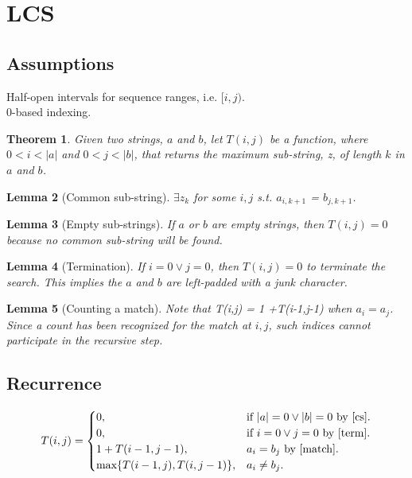 \documentclass{article}
\newtheorem{theorem}{Theorem}[section]
\newtheorem{lemma}[theorem]{Lemma}
\begin{document}
	
	\section{LCS}
	\subsection{Assumptions}
	Half-open intervals for sequence ranges, i.e. $[i,j)$.\\
	0-based indexing.
	\begin{theorem}
	Given two strings, $a$ and $b$, let $T(i, j)$ be a function, where $0 < i < |a|$ and $0 < j < |b|$, that returns the 
	maximum sub-string, z, of length $k$ in $a$ and $b$.
	\end{theorem}
	
	\begin{lemma} [Common sub-string]
	\label{zk}	
	$\exists z_k$ for some $i, j$ s.t. $a_{i, k+1}$ = $b_{j, k+1}$.
	\end{lemma}
	
	\begin{lemma} [Empty sub-strings]
	\label{cs}	
	If $a$ or $b$ are empty strings, then $T(i,j)=0$ because no common sub-string will be found.
	\end{lemma}
	
	\begin{lemma} [Termination]
	\label{term}	
	If $i=0 \vee j=0$, then $T(i,j)=0$ to terminate the search. This implies the $a$ and $b$ are left-padded with a junk character.
	\end{lemma}
	
	\begin{lemma} [Counting a match]
	\label{match}	
	Note that T(i,j) = 1 +T(i-1,j-1) when  $a_i = a_j$. Since a count has been recognized for the match at $i, j$, such indices cannot participate in the recursive step.
	\end{lemma}
	
	\subsection{Recurrence}
	 \begin{equation}
	T(i, j)=			
	\begin{cases}
	0, & \text{if $|a|=0 \vee |b|=0$ by \ref{cs}}.\\
	0, & \text{if $i=0 \vee j=0$ by \ref{term}}.\\	
	1+T(i-1,j-1), & \text{$a_i = b_j$ by \ref{match}}.\\
	\text{max}\{T(i-1,j), T(i,j-1)\}, & \text{$a_i \neq b_j$}.
				
	\end{cases}
	\end{equation}	
\end{document}
